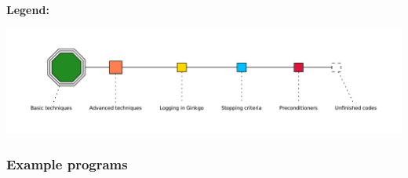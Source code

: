 {\bfseries Legend\+:}~\newline
 
\begin{DoxyImageNoCaption}
  \mbox{\includegraphics[width=\textwidth,height=\textheight/2,keepaspectratio=true]{dot_inline_dotgraph_2}}
\end{DoxyImageNoCaption}


\label{_list}%
 \subsubsection*{Example programs }

